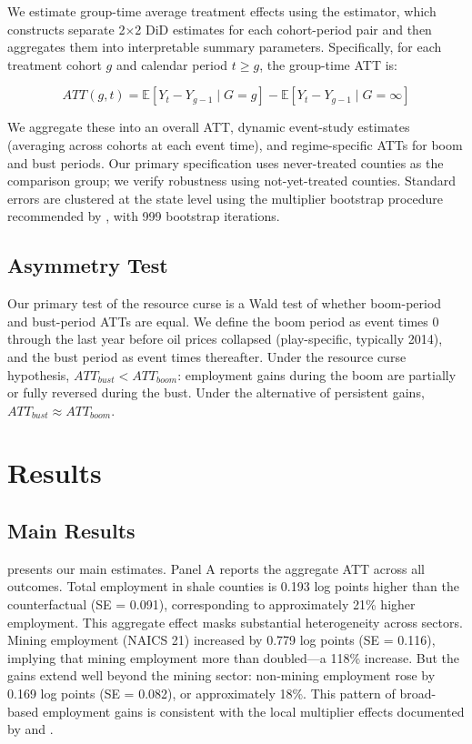 \documentclass[12pt]{article}
\newcommand{\E}{\mathbb{E}}
\begin{document}
We estimate group-time average treatment effects using the \citet{callaway2021difference} estimator, which constructs separate 2$\times$2 DiD estimates for each cohort-period pair and then aggregates them into interpretable summary parameters. Specifically, for each treatment cohort $g$ and calendar period $t \geq g$, the group-time ATT is:

\begin{equation}
ATT(g,t) = \E[Y_t - Y_{g-1} \mid G = g] - \E[Y_t - Y_{g-1} \mid G = \infty]
\label{eq:att_gt}
\end{equation}

We aggregate these into an overall ATT, dynamic event-study estimates (averaging across cohorts at each event time), and regime-specific ATTs for boom and bust periods. Our primary specification uses never-treated counties as the comparison group; we verify robustness using not-yet-treated counties. Standard errors are clustered at the state level using the multiplier bootstrap procedure recommended by \citet{callaway2021difference}, with 999 bootstrap iterations.

\subsection{Asymmetry Test}

Our primary test of the resource curse is a Wald test of whether boom-period and bust-period ATTs are equal. We define the boom period as event times 0 through the last year before oil prices collapsed (play-specific, typically 2014), and the bust period as event times thereafter. Under the resource curse hypothesis, $ATT_{bust} < ATT_{boom}$: employment gains during the boom are partially or fully reversed during the bust. Under the alternative of persistent gains, $ATT_{bust} \approx ATT_{boom}$.


\section{Results}
\label{sec:results}

\subsection{Main Results}

 presents our main estimates. Panel A reports the aggregate ATT across all outcomes. Total employment in shale counties is 0.193 log points higher than the counterfactual (SE = 0.091), corresponding to approximately 21\% higher employment. This aggregate effect masks substantial heterogeneity across sectors. Mining employment (NAICS 21) increased by 0.779 log points (SE = 0.116), implying that mining employment more than doubled---a 118\% increase. But the gains extend well beyond the mining sector: non-mining employment rose by 0.169 log points (SE = 0.082), or approximately 18\%. This pattern of broad-based employment gains is consistent with the local multiplier effects documented by \citet{moretti2010local} and \citet{feyrer2017geographic}.
\end{document}
